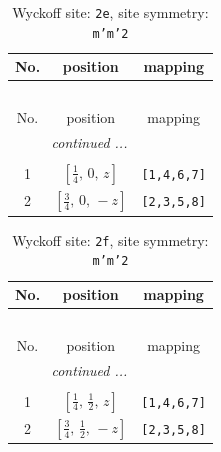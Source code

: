 \documentclass[fleqn,8pt]{jsarticle}
\begin{document}
\begin{longtable}{ccc}
\caption{Wyckoff site: {\tt 2e}, site symmetry: {\tt m'm'2}}
 \\
 \hline \hline
No. & position & mapping \\ \hline \endfirsthead

\multicolumn{2}{l}{\tablename\ \thetable{}} \\
 \hline \hline
No. & position & mapping \\ \hline \endhead

 \hline \hline
\multicolumn{2}{r}{\footnotesize\it continued ...} \\ \endfoot

 \hline \hline
\multicolumn{2}{r}{} \\ \endlastfoot

1 & $\left[ \frac{1}{4},\, 0,\, z \right]$ & {\tt [1,4,6,7]} \\ \hline
2 & $\left[ \frac{3}{4},\, 0,\, - z \right]$ & {\tt [2,3,5,8]} \\
\end{longtable}
\renewcommand{\arraystretch}{1.2}
\begin{longtable}{ccc}
\caption{Wyckoff site: {\tt 2f}, site symmetry: {\tt m'm'2}}
 \\
 \hline \hline
No. & position & mapping \\ \hline \endfirsthead

\multicolumn{2}{l}{\tablename\ \thetable{}} \\
 \hline \hline
No. & position & mapping \\ \hline \endhead

 \hline \hline
\multicolumn{2}{r}{\footnotesize\it continued ...} \\ \endfoot

 \hline \hline
\multicolumn{2}{r}{} \\ \endlastfoot

1 & $\left[ \frac{1}{4},\, \frac{1}{2},\, z \right]$ & {\tt [1,4,6,7]} \\ \hline
2 & $\left[ \frac{3}{4},\, \frac{1}{2},\, - z \right]$ & {\tt [2,3,5,8]} \\
\end{longtable}
\renewcommand{\arraystretch}{1.2}
\end{document}
